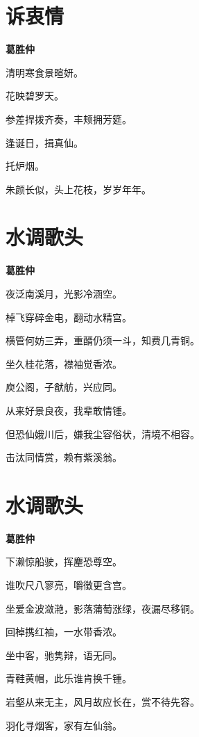 \documentclass[12pt,a4paper]{ctexbook}
\begin{document}
\section{诉衷情}
\textbf{葛胜仲}\par\vspace{0.5em}
清明寒食景暄妍。\par
花映碧罗天。\par
参差捍拨齐奏，丰颊拥芳筵。\par
逢诞日，揖真仙。\par
托炉烟。\par
朱颜长似，头上花枝，岁岁年年。\par

\section{水调歌头}
\textbf{葛胜仲}\par\vspace{0.5em}
夜泛南溪月，光影冷涵空。\par
棹飞穿碎金电，翻动水精宫。\par
横管何妨三弄，重醑仍须一斗，知费几青铜。\par
坐久桂花落，襟袖觉香浓。\par
庾公阁，子猷舫，兴应同。\par
从来好景良夜，我辈敢情锺。\par
但恐仙娥川后，嫌我尘容俗状，清境不相容。\par
击汰同情赏，赖有紫溪翁。\par

\section{水调歌头}
\textbf{葛胜仲}\par\vspace{0.5em}
下濑惊船驶，挥麈恐尊空。\par
谁吹尺八寥亮，嚼徵更含宫。\par
坐爱金波潋滟，影落蒲萄涨绿，夜漏尽移铜。\par
回棹携红袖，一水带香浓。\par
坐中客，驰隽辩，语无同。\par
青鞋黄帽，此乐谁肯换千锺。\par
岩壑从来无主，风月故应长在，赏不待先容。\par
羽化寻烟客，家有左仙翁。\par
\end{document}
